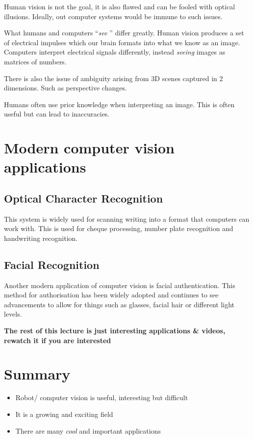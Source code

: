 \documentclass{article}
\begin{document}
Human vision is not the goal, it is also flawed and can be fooled with optical illusions. Ideally, out computer systems would be immune to such issues.

What humans and computers ``\textit{see} '' differ greatly. Human vision produces a set of electrical impulses which our brain formats into what we know as an image. Computers interpret electrical signals differently, instead \textit{seeing} images as matrices of numbers.

There is also the issue of ambiguity arising from 3D scenes captured in 2 dimensions. Such as perspective changes.


Humans often use prior knowledge when interpreting an image. This is often useful but can lead to inaccuracies.

\section{Modern computer vision applications}

\subsection{Optical Character Recognition}

This system is widely used for scanning writing into a format that computers can work with. This is used for cheque processing, number plate recognition and handwriting recognition.

\subsection{Facial Recognition}

Another modern application of computer vision is facial authentication. This method for authorisation has been widely adopted and continues to see advancements to allow for things such as glasses, facial hair or different light levels.


\textbf{The rest of this lecture is just interesting applications \& videos, rewatch it if you are interested}

\section{Summary}

\begin{itemize}
  \item Robot/ computer vision is useful, interesting but difficult
  \item It is a growing and exciting field
  \item There are many \textit{cool} and important applications
\end{itemize}
\end{document}
